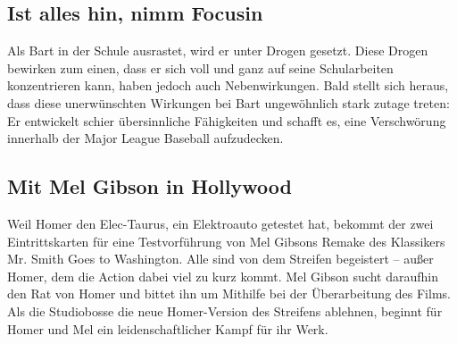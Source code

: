
	
\subsection{Ist alles hin, nimm Focusin}
Als Bart in der Schule ausrastet, wird er unter Drogen gesetzt. Diese Drogen bewirken zum einen, dass er sich voll und ganz auf seine Schularbeiten konzentrieren kann, haben jedoch auch Nebenwirkungen. Bald stellt sich heraus, dass diese unerwünschten Wirkungen bei Bart ungewöhnlich stark zutage treten: Er entwickelt schier übersinnliche Fähigkeiten und schafft es, eine Verschwörung innerhalb der Major League Baseball aufzudecken.

	
\subsection{Mit Mel Gibson in Hollywood}\label{AABF23}
Weil Homer den \glqq Elec-Taurus\grqq , ein Elektroauto getestet hat, bekommt der zwei Eintrittskarten für eine Testvorführung von Mel Gibsons Remake des Klassikers \glqq Mr. Smith Goes to Washington\grqq . Alle sind von dem Streifen begeistert -- außer Homer, dem die Action dabei viel zu kurz kommt. Mel Gibson sucht daraufhin den Rat von Homer und bittet ihn um Mithilfe bei der Überarbeitung des Films. Als die Studiobosse die neue Homer-Version des Streifens ablehnen, beginnt für Homer und Mel ein leidenschaftlicher Kampf für ihr Werk.

